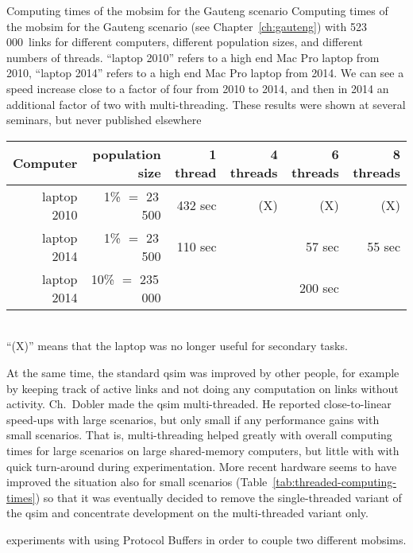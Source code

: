 \createtable%
{Computing times of the \gls{mobsim} for the Gauteng scenario}%
{Computing times of the \gls{mobsim} for the Gauteng scenario (see Chapter~\ref{ch:gauteng}) with 523\,000~links for different computers, different population sizes, and different numbers of threads.  ``laptop 2010'' refers to a high end Mac Pro laptop from 2010, ``laptop 2014'' refers to a high end Mac Pro laptop from 2014. We can see a speed increase close to a factor of four from 2010 to 2014, and then in 2014 an additional factor of two with multi-threading.  These results were shown at several seminars, but never published elsewhere}%
{\label{tab:threaded-computing-times}}%
{%
  \begin{tabular}{|r|r||r|r|r|r|}
    \hline
Computer & population size & 1 thread & 4 threads & 6 threads & 8 threads \\
\hline
\hline
laptop 2010 & 1\% $=$ 23\,500 & 432 sec & (X) & (X) & (X) \\
\hline
laptop 2014 & 1\% $=$ 23\,500 & 110 sec & & 57 sec & 55 sec \\
\hline
laptop 2014 & 10\% $=$ 235\,000 & & & 200 sec & \\
\hline
  \end{tabular}
\\
{\footnotesize ``(X)'' means that the laptop was no longer useful for secondary tasks. \hfill}
}%
{}

At the same time, the standard \gls{qsim} was improved by other people, for example by keeping track of active links and not doing any computation on links without activity.  Ch.~Dobler made the \gls{qsim} multi-threaded.  He reported \citep[][Chapter~5]{Dobler_PhDThesis_2013} close-to-linear speed-ups with large scenarios, but only small if any performance gains with small scenarios.  That is, multi-threading helped greatly with overall computing times for large scenarios on large shared-memory computers, but little with with quick turn-around during experimentation.  More recent hardware seems to have improved the situation also for small scenarios (Table~\ref{tab:threaded-computing-times}) so that it was eventually decided to remove the single-threaded variant of the \gls{qsim} and concentrate development on the multi-threaded variant only.  

\cite{LaemmelEtAl2016hybridTRB} experiments with using Protocol Buffers \citep{ProtocolBuffersWww} in order to couple two different \glspl{mobsim}.

